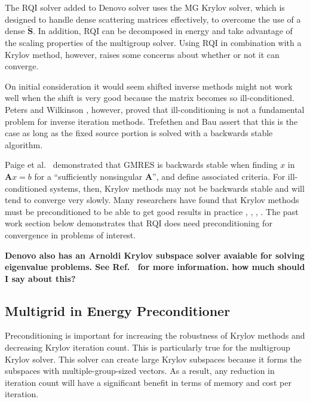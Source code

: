 \documentclass[preprint,12pt]{elsarticle}
\newcommand{\ve}[1]{\ensuremath{\mathbf{#1}}}
\begin{document}
The RQI solver added to Denovo solver uses the MG Krylov solver, which is designed to handle dense scattering matrices effectively, to overcome the use of a dense $\ve{\tilde{S}}$. In addition, RQI can be decomposed in energy and take advantage of the scaling properties of the multigroup solver. Using RQI in combination with a Krylov method, however, raises some concerns about whether or not it can converge. 


On initial consideration it would seem shifted inverse methods might not work well when the shift is very good because the matrix becomes so ill-conditioned. Peters and Wilkinson \cite{Peters1979}, however, proved that ill-conditioning is not a fundamental problem for inverse iteration methods. Trefethen and Bau \cite{Trefethen1997} assert that this is the case as long as the fixed source portion is solved with a backwards stable algorithm. 

Paige et al.\ \cite{Paige2006} demonstrated that GMRES is backwards stable when finding $x$ in $\ve{A}x = b$ for a ``sufficiently nonsingular $\ve{A}$'', and define associated criteria. For ill-conditioned systems, then, Krylov methods may not be backwards stable and will tend to converge very slowly. Many researchers have found that Krylov methods must be preconditioned to be able to get good results in practice \cite{Benzi2002}, \cite{Saad1986}, \cite{Trefethen1997} , \cite{Paige2006}. The past work section below demonstrates that RQI does need preconditioning for convergence in problems of interest.

\textbf{Denovo also has an Arnoldi Krylov subspace solver avaiable for solving eigenvalue problems. See Ref.\ \cite{Davidson2013} for more information. 
how much should I say about this?}

\subsection{Multigrid in Energy Preconditioner}
\label{sec:precond}
Preconditioning is important for increasing the robustness of Krylov methods and decreasing Krylov iteration count. This is particularly true for the multigroup Krylov solver. This solver can create large Krylov subspaces because it forms the subspaces with multiple-group-sized vectors. As a result, any reduction in iteration count will have a significant benefit in terms of memory and cost per iteration. 
 
\end{document}
